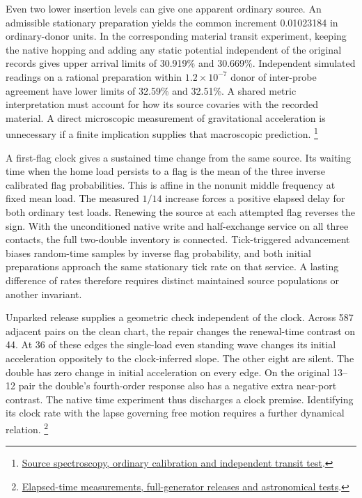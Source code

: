 \documentclass[11pt]{article}
\begin{document}
Even two lower insertion levels can give one apparent ordinary
source. An admissible stationary preparation yields the common
increment 0.01023184 in ordinary-donor units. In the corresponding
material transit experiment, keeping the native hopping and adding any
static potential independent of the original records gives upper
arrival limits of 30.919\% and 30.669\%. Independent simulated
readings on a rational preparation within \(1.2\times10^{-7}\)
donor of inter-probe agreement have lower limits of 32.59\% and
32.51\%. A shared metric interpretation must account for how its
source covaries with the recorded material. A direct microscopic
measurement of gravitational acceleration is unnecessary if a finite
implication supplies that macroscopic prediction.%
\footnote{\href{https://github.com/FloatingPragma/observer-patch-holography/blob/main/model/experiments/interval_echo_shell_flux/product_address/green_response/material_recoil/overlap_source/native_boundary/stock/aperture/PAIR_FIELD_RESULTS.md}{Source spectroscopy, ordinary calibration and independent transit test}.}

A first-flag clock gives a sustained time change from the same source.
Its waiting time when the home load persists to a flag is the mean
of the three inverse calibrated flag probabilities. This is affine
in the nonunit middle frequency at fixed mean load. The measured
\(1/14\) increase forces a positive elapsed delay for both ordinary
test loads. Renewing the source at each attempted flag reverses the
sign. With the unconditioned native write and half-exchange service on
all three contacts, the full two-double inventory is connected.
Tick-triggered advancement biases random-time samples by inverse flag
probability, and both initial preparations approach the same stationary
tick rate on that service. A lasting difference of rates therefore
requires distinct maintained source populations or another invariant.

Unparked release supplies a geometric check independent of the clock.
Across 587 adjacent pairs on the clean chart, the repair changes the
renewal-time contrast on 44. At 36 of these edges the single-load
even standing wave changes its initial acceleration oppositely to the
clock-inferred slope. The other eight are silent. The double has
zero change in initial acceleration on every edge. On the original
13--12 pair the double's fourth-order response also has a negative
extra near-port contrast. The native time experiment thus discharges
a clock premise. Identifying its clock rate with the lapse governing
free motion requires a further dynamical relation.%
\footnote{\href{https://github.com/FloatingPragma/observer-patch-holography/blob/main/model/experiments/interval_echo_shell_flux/product_address/green_response/material_recoil/overlap_source/native_boundary/stock/aperture/RENEWAL_RESULTS.md}{Elapsed-time measurements, full-generator releases and astronomical tests}.}
\end{document}
